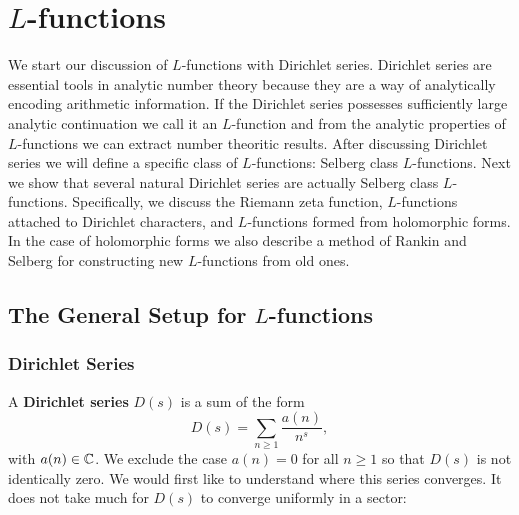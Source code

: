 \chapter{\texorpdfstring{$L$}{L}-functions}\label{ch:Standard_Class_L-functions}
  We start our discussion of $L$-functions with Dirichlet series. Dirichlet series are essential tools in analytic number theory because they are a way of analytically encoding arithmetic information. If the Dirichlet series possesses sufficiently large analytic continuation we call it an $L$-function and from the analytic properties of $L$-functions we can extract number theoritic results. After discussing Dirichlet series we will define a specific class of $L$-functions: Selberg class $L$-functions. Next we show that several natural Dirichlet series are actually Selberg class $L$-functions. Specifically, we discuss the Riemann zeta function, $L$-functions attached to Dirichlet characters, and $L$-functions formed from holomorphic forms. In the case of holomorphic forms we also describe a method of Rankin and Selberg for constructing new $L$-functions from old ones.
  \section{The General Setup for \texorpdfstring{$L$}{L}-functions}\label{sec:The_General_Setup_for_L-functions}
    \subsection*{Dirichlet Series}
      A \textbf{Dirichlet series} $D(s)$ is a sum of the form
      \[
        D(s) = \sum_{n \ge 1}\frac{a(n)}{n^{s}},
      \]
      with $a(n) \in \mathbb{C}$. We exclude the case $a(n) = 0$ for all $n \ge 1$ so that $D(s)$ is not identically zero. We would first like to understand where this series converges. It does not take much for $D(s)$ to converge uniformly in a sector:

